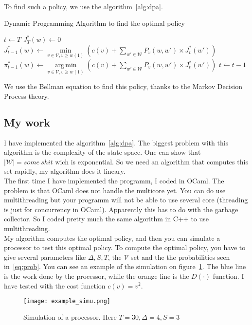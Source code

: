 \documentclass[
10pt, %
a4paper, %
oneside, %
headinclude,footinclude, %
BCOR5mm, %
]{scrartcl}
\DeclareMathOperator*{\argmin}{arg\,min}
\newcommand{\V}{\mathcal{V}}
\newcommand{\W}{\mathcal{W}}
\begin{document}
To find such a policy, we use the algorithm~\ref{alg:dpa}.
\begin{algorithm}
  \caption{Dynamic Programming Algorithm to find the optimal policy}
  \label{alg:dpa}
  \begin{algorithmic}
    \STATE $t\leftarrow T$
    \FORALL{$w\in\W$}
    \STATE $J_T^*(w)\leftarrow 0$
    \ENDFOR
    \FORALL{$w\in\W$}
    \STATE $J_{t-1}^*(w)\leftarrow
    \min\limits_{v\in\V,v\geq
      w(1)}\left(c(v)+\sum\limits_{w'\in\W}P_v(w,w')\times
      J_t^*(w')\right)$
    \STATE $\pi_{t-1}^*(w)\leftarrow
    \argmin\limits_{v\in\V,v\geq
      w(1)}\left(c(v)+\sum\limits_{w'\in\W}P_v(w,w')\times
      J_t^*(w')\right)$
    \ENDFOR
    \STATE $t\leftarrow t-1$
    \ENDWHILE
  \end{algorithmic}
\end{algorithm}

We use the Bellman equation to find this policy, thanks to the Markov
Decision Process theory.

\subsection{My work}
I have implemented the algorithm~\ref{alg:dpa}. The biggest problem
with this algorithm is the complexity of the state space. One can show
that $|\W|=some~shit$ wich is exponential. So we need an algorithm
that computes this set rapidly, my algorithm does it lineary.\\
The first time I have implemented the programm, I coded in OCaml. The
problem is that OCaml does not handle the multicore yet. You can do
use multithreading but your programm will not be able to use several
core (threading is just for concurrency in OCaml). Apparently this has
to do with the garbage collector. So I coded pretty much the same
algorithm in C++ to use multithreading.\\
My algorithm computes the optimal policy, and then you can simulate a
processor to test this optimal policy. To compute the optimal policy,
you have to give several parameters like $\Delta, S,T$, the $\V$
set and the the probabilities seen in~\ref{eq:prob}.
You can see an example of the simulation on
figure~\ref{fig:simu}. The blue line is the work done by the
processor, while the orange line is the $D(\cdot)$ function. I have
tested with the cost function $c(v)=v^2$.

\begin{figure}
  \centering
  \texttt{[image: example\_simu.png]}
  \caption{Simulation of a processor. Here $T=30,\Delta=4,S=3$}
  \label{fig:simu}
\end{figure}
\end{document}
